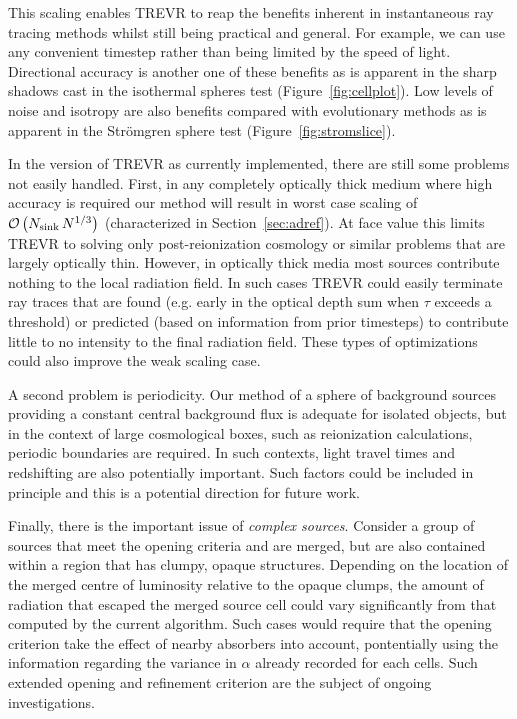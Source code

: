 \documentclass[fleq,usenatbib]{mnras}
\newcommand{\acro}{TREVR}
\newcommand{\bigO}[1]{\mathcal{O}\left(#1\right)}
\newcommand{\NK}{N_{\rm sink}}
\newcommand{\strom}{Str\"omgren}
\begin{document}
{This scaling enables \acro{} to reap the benefits inherent in instantaneous 
ray tracing methods whilst still being practical and general.  For example,
we can use any convenient timestep rather than being limited by the speed of 
light. Directional accuracy is another one of these benefits as is apparent in 
the sharp shadows cast in the isothermal spheres test 
(Figure~\ref{fig:cellplot}). Low levels of noise and isotropy are also 
benefits compared with evolutionary methods as is apparent in the \strom{} 
sphere test (Figure~\ref{fig:stromslice}).

In the version of \acro{} as currently implemented, there are still some 
problems not easily handled. First, in any completely optically thick medium 
where high accuracy is required our method will result in worst case scaling 
of $\bigO{\NK\,N^{1/3}}$ (characterized in Section~\ref{sec:adref}). At face 
value this limits \acro{} to solving only post-reionization cosmology or 
similar problems that are largely optically thin. However, in optically thick 
media most sources contribute nothing to the local radiation field. In such 
cases \acro{} could easily terminate ray traces that are found (e.g. early in 
the optical depth sum when $\tau$ exceeds a threshold) or predicted (based on 
information from prior timesteps) to contribute little to no intensity to the 
final radiation field. These types of optimizations could also improve the 
weak scaling case.

A second problem is periodicity. Our method of a sphere of background sources 
providing a constant central background flux is adequate for isolated objects, 
but in the context of large cosmological boxes, such as reionization 
calculations, periodic boundaries are required. In such contexts, light travel 
times and redshifting are also potentially important. Such factors could be 
included in principle and this is a potential direction for future work.

Finally, there is the important issue of \textit{complex sources}. 
Consider a group of sources that meet the opening criteria and are merged, 
but are also contained within a region that has clumpy, opaque structures. 
Depending on the location of the merged centre of luminosity relative to the 
opaque clumps, the amount of radiation that escaped the merged source cell 
could vary significantly from that computed by the current algorithm.
Such cases would require that the opening criterion take the effect of
nearby absorbers into account, pontentially using the information regarding
the variance in $\alpha$ already recorded for each cells. Such extended opening
and refinement criterion are the subject of ongoing investigations.

}
\end{document}
